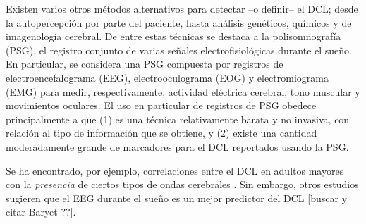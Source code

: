 
Existen varios otros métodos alternativos para detectar --o definir-- el DCL; desde la autopercepción por parte del paciente, hasta análisis genéticos, químicos y de imagenología cerebral.
%
De entre estas técnicas se destaca a la polisomnografía (PSG), el registro conjunto de varias señales electrofisiológicas durante el sueño.
%
En particular, se considera una PSG compuesta por registros de electroencefalograma (EEG), electrooculograma (EOG) y electromiograma (EMG) para medir, respectivamente, actividad eléctrica cerebral, tono muscular y movimientos oculares.
%
El uso en particular de registros de PSG obedece principalmente a que (1) es una técnica relativamente barata y no invasiva, con relación al tipo de información que se obtiene, y (2) existe una cantidad moderadamente grande de marcadores para el DCL reportados usando la PSG.

Se ha encontrado, por ejemplo, correlaciones entre el DCL en adultos mayores con la \textit{presencia} de ciertos tipos de ondas cerebrales \cite{babiloni13,prichep94,prichep06}.
%
Sin embargo, otros estudios sugieren que el EEG durante el sueño es un mejor predictor del DCL [buscar y citar Baryet ??].
%
%

